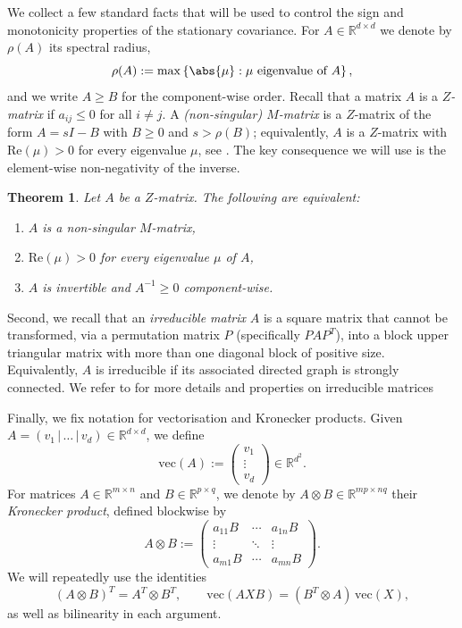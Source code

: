 \documentclass[10pt]{amsart}
\newtheorem{theorem}{Theorem}[section]
\numberwithin{equation}{section}
\renewcommand{\Re}{\mathrm{Re}}
\begin{document}
We collect a few standard facts that will be used to control the sign and monotonicity properties of the stationary covariance. For $A\in\mathbb{R}^{d\times d}$ we denote by $\rho(A)$ its spectral radius,
$$
\rho(A):=\max\left \lbrace \abs{\mu}:\mu\ \text{eigenvalue of }A\right \rbrace,
$$
and we write $A\geq B$ for the component-wise order. Recall that a matrix $A$ is a \emph{$Z$-matrix} if $a_{ij}\leq 0$ for all $i\neq j$. A \emph{(non-singular) $M$-matrix} is a $Z$-matrix of the form $A=sI-B$ with $B\geq0$ and $s>\rho(B)$; equivalently, $A$ is a $Z$-matrix with $\Re(\mu)>0$ for every eigenvalue $\mu$, see \cite{Plemmons1981,Plemmons1994}. The key consequence we will use is the element-wise non-negativity of the inverse.
\begin{theorem}
\label{thm: characterisation invertible M matrix}
Let $A$ be a $Z$-matrix. The following are equivalent:
\begin{enumerate}
\item[(i)] $A$ is a non-singular $M$-matrix,
\item[(ii)] $\Re(\mu)>0$ for every eigenvalue $\mu$ of $A$,
\item[(iii)] $A$ is invertible and $A^{-1}\geq 0$ component-wise.
\end{enumerate}
\end{theorem}

Second, we recall that an \emph{irreducible matrix} $A$ is a square matrix that cannot be transformed, via a permutation matrix $P$ (specifically $PAP^{T}$), into a block upper triangular matrix with more than one diagonal block of positive size. Equivalently, $A$ is irreducible if its associated directed graph is strongly connected. We refer to \cite[Chapter 2.2.] {Plemmons1994} for more details and properties on irreducible matrices



Finally, we fix notation for vectorisation and Kronecker products. Given $A=(v_1\,|\,\dots\,|\,v_d)\in\mathbb{R}^{d\times d}$, we define
$$
\mathrm{vec}(A):=\begin{pmatrix}v_1\\ \vdots\\ v_d\end{pmatrix}\in\mathbb{R}^{d^2}.
$$
For matrices $A\in\mathbb{R}^{m\times n}$ and $B\in\mathbb{R}^{p\times q}$, we denote by $A\otimes B\in\mathbb{R}^{mp\times nq}$ their \emph{Kronecker product}, defined blockwise by
$$
A\otimes B :=
\begin{pmatrix}
a_{11}B & \cdots & a_{1n}B\\
\vdots  & \ddots & \vdots\\
a_{m1}B & \cdots & a_{mn}B
\end{pmatrix}.
$$
We will repeatedly use the identities
\begin{equation}
\label{eq: kron identities}
(A\otimes B)^T=A^T\otimes B^T,
\qquad
\mathrm{vec}(AXB)=(B^T\otimes A)\,\mathrm{vec}(X),
\end{equation}
as well as bilinearity in each argument.
\end{document}
